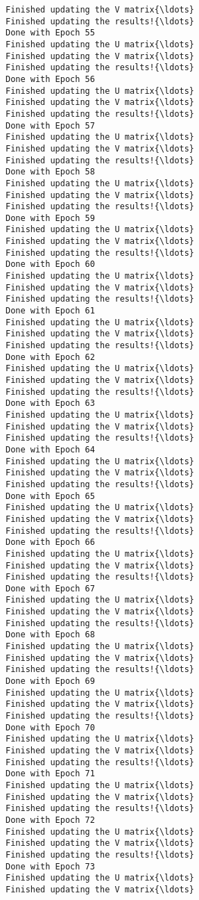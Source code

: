 \documentclass{article}
\begin{document}
\begin{Verbatim}[commandchars=\\\{\}]
Finished updating the V matrix{\ldots}
Finished updating the results!{\ldots}
Done with Epoch 55
Finished updating the U matrix{\ldots}
Finished updating the V matrix{\ldots}
Finished updating the results!{\ldots}
Done with Epoch 56
Finished updating the U matrix{\ldots}
Finished updating the V matrix{\ldots}
Finished updating the results!{\ldots}
Done with Epoch 57
Finished updating the U matrix{\ldots}
Finished updating the V matrix{\ldots}
Finished updating the results!{\ldots}
Done with Epoch 58
Finished updating the U matrix{\ldots}
Finished updating the V matrix{\ldots}
Finished updating the results!{\ldots}
Done with Epoch 59
Finished updating the U matrix{\ldots}
Finished updating the V matrix{\ldots}
Finished updating the results!{\ldots}
Done with Epoch 60
Finished updating the U matrix{\ldots}
Finished updating the V matrix{\ldots}
Finished updating the results!{\ldots}
Done with Epoch 61
Finished updating the U matrix{\ldots}
Finished updating the V matrix{\ldots}
Finished updating the results!{\ldots}
Done with Epoch 62
Finished updating the U matrix{\ldots}
Finished updating the V matrix{\ldots}
Finished updating the results!{\ldots}
Done with Epoch 63
Finished updating the U matrix{\ldots}
Finished updating the V matrix{\ldots}
Finished updating the results!{\ldots}
Done with Epoch 64
Finished updating the U matrix{\ldots}
Finished updating the V matrix{\ldots}
Finished updating the results!{\ldots}
Done with Epoch 65
Finished updating the U matrix{\ldots}
Finished updating the V matrix{\ldots}
Finished updating the results!{\ldots}
Done with Epoch 66
Finished updating the U matrix{\ldots}
Finished updating the V matrix{\ldots}
Finished updating the results!{\ldots}
Done with Epoch 67
Finished updating the U matrix{\ldots}
Finished updating the V matrix{\ldots}
Finished updating the results!{\ldots}
Done with Epoch 68
Finished updating the U matrix{\ldots}
Finished updating the V matrix{\ldots}
Finished updating the results!{\ldots}
Done with Epoch 69
Finished updating the U matrix{\ldots}
Finished updating the V matrix{\ldots}
Finished updating the results!{\ldots}
Done with Epoch 70
Finished updating the U matrix{\ldots}
Finished updating the V matrix{\ldots}
Finished updating the results!{\ldots}
Done with Epoch 71
Finished updating the U matrix{\ldots}
Finished updating the V matrix{\ldots}
Finished updating the results!{\ldots}
Done with Epoch 72
Finished updating the U matrix{\ldots}
Finished updating the V matrix{\ldots}
Finished updating the results!{\ldots}
Done with Epoch 73
Finished updating the U matrix{\ldots}
Finished updating the V matrix{\ldots}

\end{Verbatim}
\end{document}
